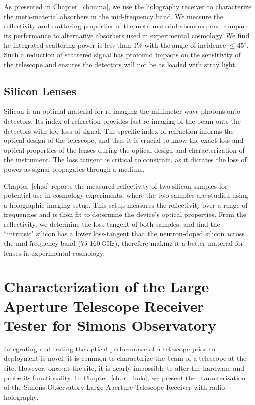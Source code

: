 As presented in Chapter~\ref{ch:mma}, we use the holography receiver to characterize the meta-material absorbers in the mid-frequency band.  We measure the reflectivity and scattering properties of the meta-material absorber, and compare its performance to alternative absorbers used in experimental cosmology.  We find he integrated scattering power is less than 1\% with the angle of incidence  $\leq45^{\circ}$.  Such a reduction of scattered signal has profound impacts on the sensitivity of the telescope and ensures the detectors will not be as loaded with stray light.

\subsection{Silicon Lenses}
Silicon is an optimal material for re-imaging the millimeter-wave photons onto detectors.  Its index of refraction provides fast re-imaging of the beam onto the detectors with low loss of signal.  The specific index of refraction informs the optical design of the telescope, and thus it is crucial to know the exact loss and optical properties of the lenses during the optical design and characterization of the instrument.  The loss tangent is critical to constrain, as it dictates the loss of power as signal propagates through a medium.

Chapter~\ref{ch:si} reports the measured reflectivity of two silicon samples for potential use in cosmology experiments, where the two samples are studied using a holographic imaging setup. This setup measures the reflectivity over a range of frequencies and is then fit to determine the device's optical properties.  From the reflectivity, we determine the loss-tangent of both samples, and find the ``intrinsic" silicon has a lower loss-tangent than the neutron-doped silicon across the mid-frequency band (75-160\,GHz), therefore making it a better material for lenses in experimental cosmology.

\section{Characterization of the Large Aperture Telescope Receiver Tester for Simons Observatory}
Integrating and testing the optical performance of a telescope prior to deployment is novel; it is common to characterize the beam of a telescope at the site.  However, once at the site, it is nearly impossible to alter the hardware and probe its functionality.  In Chapter~\ref{ch:ot_holo}, we present the characterization of the Simons Observatory Large Aperture Telescope Receiver with radio holography.

